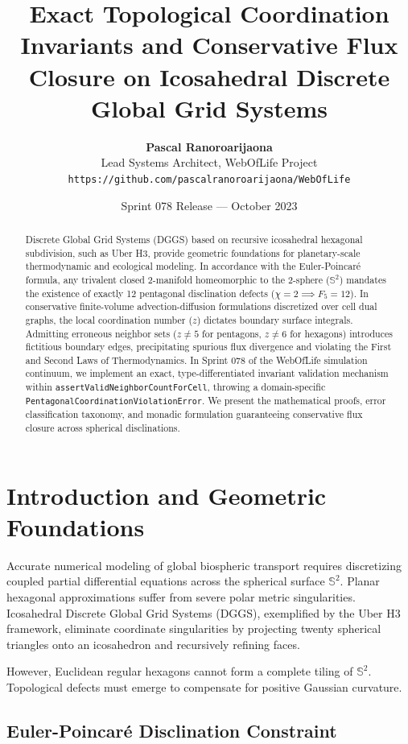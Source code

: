 \documentclass[10pt,twocolumn,a4paper]{article}
\title{\textbf{Exact Topological Coordination Invariants and Conservative Flux Closure on Icosahedral Discrete Global Grid Systems}}
\author{
    \textbf{Pascal Ranoroarijaona} \\
    Lead Systems Architect, WebOfLife Project \\
    \texttt{https://github.com/pascalranoroarijaona/WebOfLife}
}
\date{Sprint 078 Release --- October 2023}
\begin{document}
\maketitle

\begin{abstract}
Discrete Global Grid Systems (DGGS) based on recursive icosahedral hexagonal subdivision, such as Uber H3, provide geometric foundations for planetary-scale thermodynamic and ecological modeling. In accordance with the Euler-Poincar\'{e} formula, any trivalent closed 2-manifold homeomorphic to the 2-sphere ($\mathbb{S}^2$) mandates the existence of exactly 12 pentagonal disclination defects ($\chi = 2 \implies F_5 = 12$). In conservative finite-volume advection-diffusion formulations discretized over cell dual graphs, the local coordination number ($z$) dictates boundary surface integrals. Admitting erroneous neighbor sets ($z \ne 5$ for pentagons, $z \ne 6$ for hexagons) introduces fictitious boundary edges, precipitating spurious flux divergence and violating the First and Second Laws of Thermodynamics. In Sprint 078 of the WebOfLife simulation continuum, we implement an exact, type-differentiated invariant validation mechanism within \texttt{assertValidNeighborCountForCell}, throwing a domain-specific \texttt{PentagonalCoordinationViolationError}. We present the mathematical proofs, error classification taxonomy, and monadic formulation guaranteeing conservative flux closure across spherical disclinations.
\end{abstract}

\section{Introduction and Geometric Foundations}

Accurate numerical modeling of global biospheric transport requires discretizing coupled partial differential equations across the spherical surface $\mathbb{S}^2$. Planar hexagonal approximations suffer from severe polar metric singularities. Icosahedral Discrete Global Grid Systems (DGGS), exemplified by the Uber H3 framework, eliminate coordinate singularities by projecting twenty spherical triangles onto an icosahedron and recursively refining faces.

However, Euclidean regular hexagons cannot form a complete tiling of $\mathbb{S}^2$. Topological defects must emerge to compensate for positive Gaussian curvature.

\subsection{Euler-Poincar\'{e} Disclination Constraint}
\end{document}
